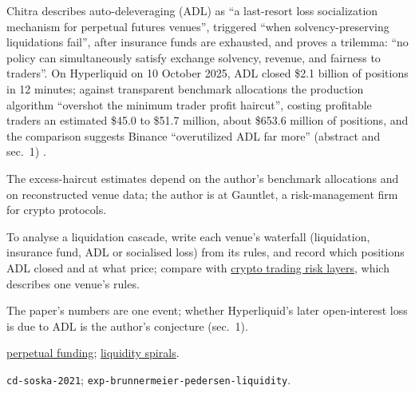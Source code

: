 \begin{qfmechanism}\label{mech:crypto-auto-deleveraging}
 Chitra describes auto-deleveraging (ADL) as ``a last-resort loss socialization mechanism for perpetual futures venues'', triggered ``when solvency-preserving liquidations fail'', after insurance funds are exhausted, and proves a trilemma: ``no policy can simultaneously satisfy exchange solvency, revenue, and fairness to traders''. On Hyperliquid on 10 October 2025, ADL closed \$2.1 billion of positions in 12 minutes; against transparent benchmark allocations the production algorithm ``overshot the minimum trader profit haircut'', costing profitable traders an estimated \$45.0 to \$51.7 million, about \$653.6 million of positions, and the comparison suggests Binance ``overutilized ADL far more'' (abstract and sec.~1) \citep[arXiv v3, abstract and sec.~1]{cd-chitra-adl-2025}.

 The excess-haircut estimates depend on the author's benchmark allocations and on reconstructed venue data; the author is at Gauntlet, a risk-management firm for crypto protocols.

 To analyse a liquidation cascade, write each venue's waterfall (liquidation, insurance fund, ADL or socialised loss) from its rules, and record which positions ADL closed and at what price; compare with \hyperref[def:crypto-trading-risk-layers]{crypto trading risk layers}, which describes one venue's rules.

 The paper's numbers are one event; whether Hyperliquid's later open-interest loss is due to ADL is the author's conjecture (sec.~1).

 \hyperref[mech:perpetual-funding]{perpetual funding}; \hyperref[mod:liquidity-spirals]{liquidity spirals}.

 \nolinkurl{cd-soska-2021}; \nolinkurl{exp-brunnermeier-pedersen-liquidity}.

\end{qfmechanism}
